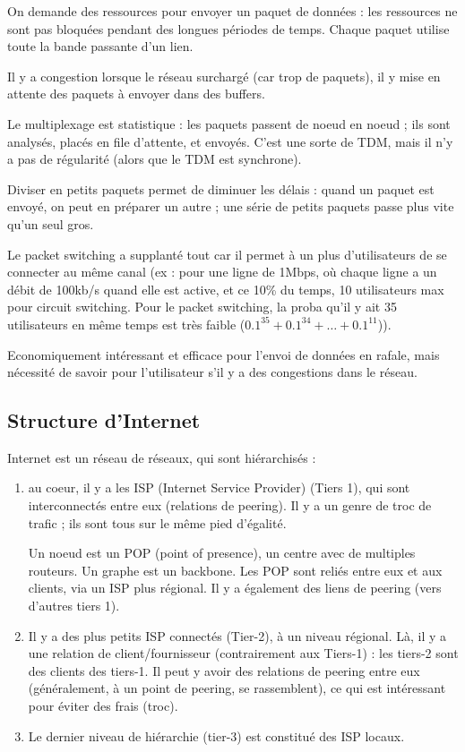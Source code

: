 	On demande des ressources pour envoyer un paquet de données : les ressources ne sont pas bloquées pendant des longues périodes de temps. Chaque paquet utilise toute la bande passante d'un lien.
	
	
	Il y a congestion lorsque le réseau surchargé (car trop de paquets), il y mise en attente des paquets à envoyer dans des buffers.
	
	Le multiplexage est statistique : les paquets passent de noeud en noeud ; ils sont analysés, placés en file d'attente, et envoyés. C'est une sorte de TDM, mais il n'y a pas de régularité (alors que le TDM est synchrone).
	
	Diviser en petits paquets permet de diminuer les délais : quand un paquet est envoyé, on peut en préparer un autre ; une série de petits paquets passe plus vite qu'un seul gros.
	
	Le packet switching a supplanté tout car il permet à un plus d'utilisateurs de se connecter au même canal (ex : pour une ligne de 1Mbps, où chaque ligne a un débit de 100kb/s quand elle est active, et ce 10\% du temps, 10 utilisateurs max pour circuit switching. Pour le packet switching, la proba qu'il y ait 35 utilisateurs en même temps est très faible ($0.1^{35} + 0.1^{34} + \dots + 0.1^{11}$)).
	
	Economiquement intéressant et efficace pour l'envoi de données en rafale, mais nécessité de savoir pour l'utilisateur s'il y a des congestions dans le réseau.

	\subsection{Structure d'Internet}

	Internet est un réseau de réseaux, qui sont hiérarchisés :

	\begin{enumerate}
		\item au coeur, il y a les ISP (Internet Service Provider) (Tiers 1), qui sont interconnectés entre eux (relations de peering). Il y a un genre de troc de trafic ; ils sont tous sur le même pied d'égalité.

		Un noeud est un POP (point of presence), un centre avec de multiples routeurs. Un graphe est un backbone. Les POP sont reliés entre eux et aux clients, via un ISP plus régional. Il y a également des liens de peering (vers d'autres tiers 1).
	

		\item Il y a des plus petits ISP connectés (Tier-2), à un niveau régional. Là, il y a une relation de client/fournisseur (contrairement aux Tiers-1) : les tiers-2 sont des clients des tiers-1. Il peut y avoir des relations de peering entre eux (généralement, à un point de peering, se rassemblent), ce qui est intéressant pour éviter des frais (troc).

		\item Le dernier niveau de hiérarchie (tier-3) est constitué des ISP locaux.
	\end{enumerate}
	
